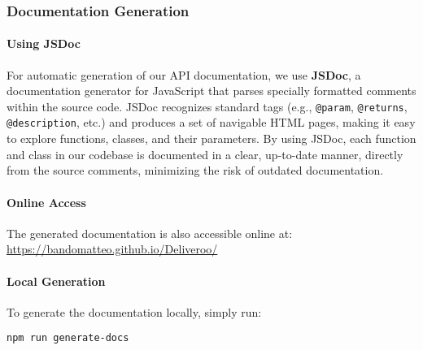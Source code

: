 \subsubsection*{Documentation Generation}

\paragraph{Using JSDoc}
For automatic generation of our API documentation, we use \textbf{JSDoc}, a documentation generator for JavaScript that parses specially formatted comments within the source code. JSDoc recognizes standard tags (e.g., \texttt{@param}, \texttt{@returns}, \texttt{@description}, etc.) and produces a set of navigable HTML pages, making it easy to explore functions, classes, and their parameters. By using JSDoc, each function and class in our codebase is documented in a clear, up-to-date manner, directly from the source comments, minimizing the risk of outdated documentation.

\paragraph{Online Access}
The generated documentation is also accessible online at: \url{https://bandomatteo.github.io/Deliveroo/}

\paragraph{Local Generation}
To generate the documentation locally, simply run:
\begin{verbatim}
npm run generate-docs
\end{verbatim}
